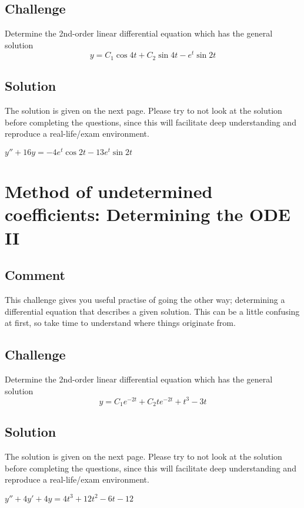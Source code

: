 \subsection*{Challenge}
Determine the 2nd-order linear differential equation which has the general solution
\begin{equation}
    y = C_1 \cos 4t + C_2 \sin 4t - e^t \sin 2t
\end{equation}

\subsection*{Solution}
The solution is given on the next page. Please try to not look at the solution before completing the questions, since this will facilitate deep understanding and reproduce a real-life/exam environment.
\newpage

$y'' + 16y = -4 e^t \cos 2t - 13 e^t \sin 2t$




\newpage
\section{Method of undetermined coefficients: Determining the ODE II}

\subsection*{Comment}
This challenge gives you useful practise of going the other way; determining a differential equation that describes a given solution. This can be a little confusing at first, so take time to understand where things originate from.

\subsection*{Challenge}
Determine the 2nd-order linear differential equation which has the general solution
\begin{equation}
    y = C_1 e^{-2t} + C_2 t e^{-2t} + t^3 - 3t
\end{equation}

\subsection*{Solution}
The solution is given on the next page. Please try to not look at the solution before completing the questions, since this will facilitate deep understanding and reproduce a real-life/exam environment.
\newpage

$y'' + 4y' + 4y = 4t^3 + 12 t^2 - 6t - 12$
